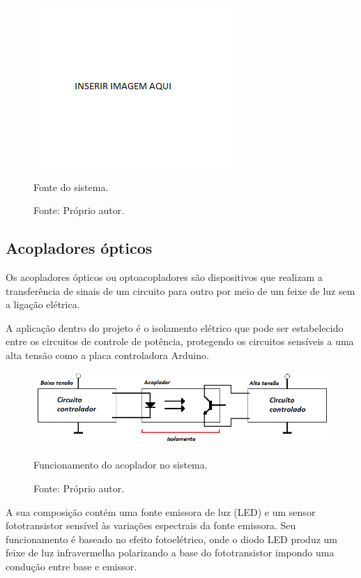 \begin{figure}[!htb]
\centering
\includegraphics[scale = 0.2]{figuras/3-17}
\caption{Fonte do sistema.}
\caption*{Fonte: Próprio autor.}
\label{figfonte}
\end{figure}
    
\subsection{Acopladores ópticos}

Os acopladores ópticos ou optoacopladores são dispositivos que realizam a transferência de 
sinais de um circuito para outro por meio de um feixe de luz sem a ligação elétrica.

A aplicação dentro do projeto é o isolamento elétrico que pode ser estabelecido entre 
os circuitos de controle de potência, protegendo os circuitos sensíveis a uma alta tensão 
como a placa controladora Arduino.

\begin{figure}[!htb]
\centering
\includegraphics[scale = 0.7]{figuras/3-18}
\caption{Funcionamento do acoplador no sistema.}
\caption*{Fonte: Próprio autor.}
\label{figacoplador}
\end{figure}
    
A sua composição contém uma fonte emissora de luz (LED) e um sensor fototransistor sensível às variações 
espectrais da fonte emissora. Seu funcionamento é baseado no efeito fotoelétrico, onde o diodo LED produz 
um feixe de luz infravermelha polarizando a base do fototransistor impondo uma condução entre base e emissor.

